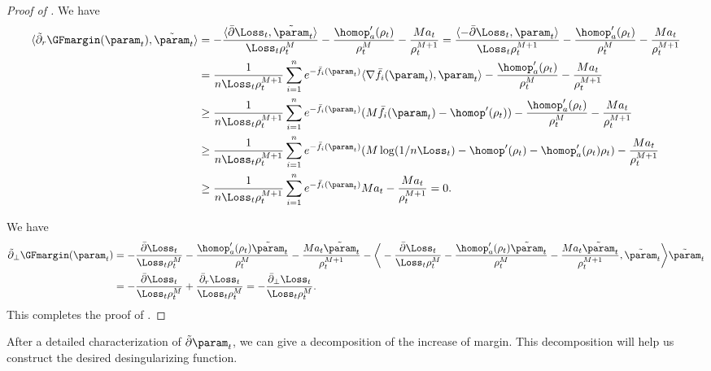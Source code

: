 \begin{proof}[Proof of ]
 We have 
\begin{align*}
\langle \tilde \partial_r \GFmargin(\param_t), \tilde \param_t \rangle 
&= - \frac{ \langle\bar \partial \Loss_t, \tilde \param_t  \rangle }{\Loss_t \rho_t^M} - \frac{\homop_a^\prime (\rho_t)}{\rho_t^M} - \frac{Ma_t}{\rho_t^{M+1}} 
= \frac{ \langle - \bar \partial \Loss_t,  \param_t  \rangle }{\Loss_t \rho_t^{M+1}} - \frac{\homop_a^\prime (\rho_t)}{\rho_t^M} - \frac{Ma_t}{\rho_t^{M+1}} 
\\ 
&= \frac{1}{ n \Loss_t \rho_t^{M+1}}\sum_{i=1}^n e^{-\bar f_i(\param_t )} \langle \nabla \bar f_i (\param_t ), \param_t \rangle - \frac{\homop_a^\prime (\rho_t)}{\rho_t^M} - \frac{Ma_t}{\rho_t^{M+1}} 
\\ 
&\ge  \frac{1}{ n \Loss_t \rho_t^{M+1}}\sum_{i=1}^n e^{-\bar f_i(\param_t )} (M \bar f_i(\param_t) - \homop^\prime (\rho_t))  - \frac{\homop_a^\prime (\rho_t)}{\rho_t^M} - \frac{Ma_t}{\rho_t^{M+1}} 
\\ 
&\ge \frac{1}{ n \Loss_t \rho_t^{M+1}}\sum_{i=1}^n e^{-\bar f_i(\param_t )} (M \log (1/ n \Loss_t) - \homop^\prime (\rho_t) - \homop_a^\prime (\rho_t) \rho_t)   - \frac{Ma_t}{\rho_t^{M+1}} \\ 
&\ge \frac{1}{ n \Loss_t \rho_t^{M+1}}\sum_{i=1}^n e^{-\bar f_i(\param_t )} M a_t   - \frac{Ma_t}{\rho_t^{M+1}}
= 0.
\end{align*}

 We have 
\begin{align*}
\tilde \partial_\perp \GFmargin(\param_t) 
&=  
- \frac{ \bar \partial \Loss_t}{\Loss_t \rho_t^M} - \frac{\homop_a^\prime (\rho_t) \tilde \param_t}{\rho_t^M} - \frac{Ma_t \tilde \param_t}{\rho_t^{M+1}} - 
\bigg \langle - \frac{ \bar \partial \Loss_t}{\Loss_t \rho_t^M} - \frac{\homop_a^\prime (\rho_t) \tilde \param_t}{\rho_t^M} - \frac{Ma_t \tilde \param_t}{\rho_t^{M+1}}, \tilde \param_t \bigg\rangle \tilde \param_t \\ 
& = - \frac{ \bar \partial \Loss_t}{\Loss_t \rho_t^M} + \frac{ \bar \partial_r \Loss_t}{\Loss_t \rho_t^M} = - \frac{ \bar \partial_\perp \Loss_t}{\Loss_t \rho_t^M}.
\end{align*}
This completes the proof of . 
\end{proof}

After a detailed characterization of $\tilde \partial \param_t$, we can give a decomposition of the increase of margin. This decomposition will help us construct the desired desingularizing function. 

